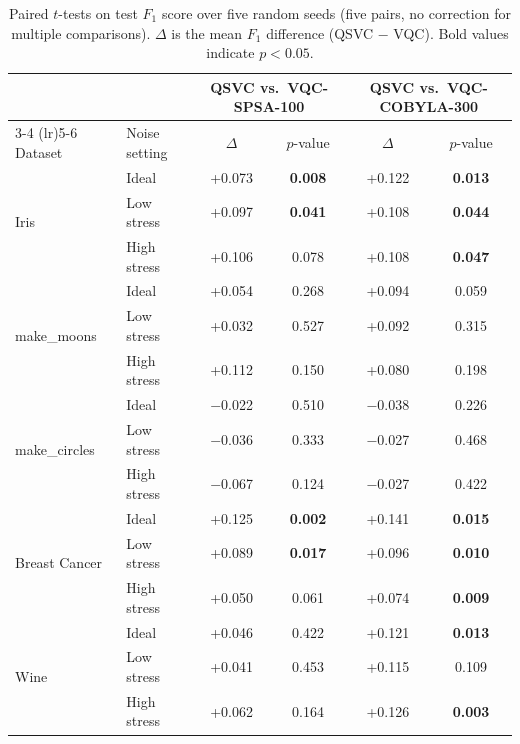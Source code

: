 \documentclass[12pt,a4paper]{article}
\newcommand{\chgcolor}{blue}
\begin{document}
\begin{table}[H]
  \centering
  \caption{Paired $t$-tests on test $F_1$ score over five random seeds (five pairs, no correction for multiple comparisons). $\Delta$ is the mean $F_1$ difference (QSVC $-$ VQC). Bold values indicate $p < 0.05$.}
  \label{tab:ttest_f1}
  \footnotesize
  \setlength{\tabcolsep}{5pt}
  \renewcommand{\arraystretch}{1.2}
  {\color{\chgcolor}\begin{tabular}{llcccc}
    \toprule
    & & \multicolumn{2}{c}{QSVC vs.\ VQC-SPSA-100} & \multicolumn{2}{c}{QSVC vs.\ VQC-COBYLA-300} \\
    \cmidrule(lr){3-4} \cmidrule(lr){5-6}
    Dataset & Noise setting & $\Delta$ & $p$-value & $\Delta$ & $p$-value \\
    \midrule
    \multirow{3}{*}{Iris} & Ideal & +0.073 & \textbf{0.008} & +0.122 & \textbf{0.013} \\
  & Low stress & +0.097 & \textbf{0.041} & +0.108 & \textbf{0.044} \\
  & High stress & +0.106 & 0.078 & +0.108 & \textbf{0.047} \\
    \midrule
    \multirow{3}{*}{make\_moons} & Ideal & +0.054 & 0.268 & +0.094 & 0.059 \\
  & Low stress & +0.032 & 0.527 & +0.092 & 0.315 \\
  & High stress & +0.112 & 0.150 & +0.080 & 0.198 \\
    \midrule
    \multirow{3}{*}{make\_circles} & Ideal & $-$0.022 & 0.510 & $-$0.038 & 0.226 \\
  & Low stress & $-$0.036 & 0.333 & $-$0.027 & 0.468 \\
  & High stress & $-$0.067 & 0.124 & $-$0.027 & 0.422 \\
    \midrule
    \multirow{3}{*}{Breast Cancer} & Ideal & +0.125 & \textbf{0.002} & +0.141 & \textbf{0.015} \\
  & Low stress & +0.089 & \textbf{0.017} & +0.096 & \textbf{0.010} \\
  & High stress & +0.050 & 0.061 & +0.074 & \textbf{0.009} \\
    \midrule
    \multirow{3}{*}{Wine} & Ideal & +0.046 & 0.422 & +0.121 & \textbf{0.013} \\
  & Low stress & +0.041 & 0.453 & +0.115 & 0.109 \\
  & High stress & +0.062 & 0.164 & +0.126 & \textbf{0.003} \\
    \bottomrule
  \end{tabular}}
\end{table}
\end{document}
